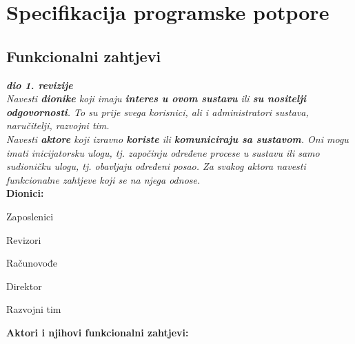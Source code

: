 \chapter{Specifikacija programske potpore}
		
	\section{Funkcionalni zahtjevi}
			
			\textbf{\textit{dio 1. revizije}}\\
			
			\textit{Navesti \textbf{dionike} koji imaju \textbf{interes u ovom sustavu} ili  \textbf{su nositelji odgovornosti}. To su prije svega korisnici, ali i administratori sustava, naručitelji, razvojni tim.}\\
				
			\textit{Navesti \textbf{aktore} koji izravno \textbf{koriste} ili \textbf{komuniciraju sa sustavom}. Oni mogu imati inicijatorsku ulogu, tj. započinju određene procese u sustavu ili samo sudioničku ulogu, tj. obavljaju određeni posao. Za svakog aktora navesti funkcionalne zahtjeve koji se na njega odnose.}\\
			
			
			\noindent \textbf{Dionici:}
			
			\begin{packed_enum}
				
				\item Zaposlenici
				\item Revizori	
				\item Računovođe
				\item Direktor
				\item Razvojni tim
				
			\end{packed_enum}
			
			\noindent \textbf{Aktori i njihovi funkcionalni zahtjevi:}
			
